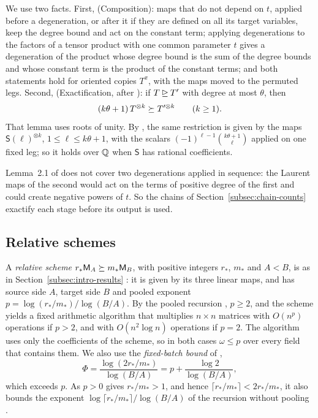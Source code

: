 We use two facts. First, \citep[Lemma~2.1]{FinCon26} (Composition): maps
that do not depend on \(t\), applied before a degeneration, or after it if
they are defined on all its target variables, keep the degree bound and
act on the constant term; applying degenerations to the factors of a
tensor product with one common parameter \(t\) gives a degeneration of
the product whose degree bound is the sum of the degree bounds and whose
constant term is the product of the constant terms; and both statements
hold for oriented copies \(T^\pi\), with the maps moved to the permuted
legs. Second, \citep[Lemma~2.2]{FinCon26} (Exactification, after
\citet{Bini80}): if \(T\unrhd T'\) with degree at most \(\theta\), then
\[
 (k\theta+1)\,T^{\otimes k}\succeq T'^{\otimes k}\qquad(k\ge1).
\]
That lemma uses roots of unity. By \citep[Lemma~9.1(c)]{FinCon26}, the same
restriction is given by the maps \(\mathsf S(\ell)^{\otimes k}\),
\(1\le\ell\le k\theta+1\), with the scalars \((-1)^{\ell-1}\binom{k\theta+1}\ell\)
applied on one fixed leg; so it holds over \(\mathbb Q\) when \(\mathsf S\) has
rational coefficients.

Lemma~2.1 of \citep{FinCon26} does not cover two degenerations applied
in sequence: the Laurent maps of the second would act on the terms of
positive degree of the first and could create negative powers of \(t\).
So the chains of Section~\ref{subsec:chain-counts} exactify each stage
before its output is used.

\subsection{Relative schemes}
\label{subsec:prelim-schemes}

A \emph{relative scheme} \(r_*\mathsf M_A\succeq m_*\mathsf M_B\), with positive
integers \(r_*\), \(m_*\) and \(A<B\), is as in
Section~\ref{subsec:intro-results} \citep[Definition~2.3]{FinCon26}: it
is given by its three linear maps, and has source side \(A\), target
side \(B\) and pooled exponent \(p=\log(r_*/m_*)/\log(B/A)\). By the
pooled recursion \citep[Lemma~2.4]{FinCon26}, \(p\ge2\), and the scheme
yields a fixed arithmetic algorithm that multiplies \(n\times n\)
matrices with \(O(n^p)\) operations if \(p>2\), and with
\(O(n^2\log n)\) operations if \(p=2\). The algorithm uses only the
coefficients of the scheme, so in both cases \(\omega\le p\) over every
field that contains them. We also use the \emph{fixed-batch bound}
of \citep[(10.1)]{FinCon26},
\begin{equation}\label{eq:prelim-phi}
 \Phi=\frac{\log(2r_*/m_*)}{\log(B/A)}=p+\frac{\log2}{\log(B/A)},
\end{equation}
which exceeds \(p\). As \(p>0\) gives \(r_*/m_*>1\), and hence
\(\lceil r_*/m_*\rceil<2r_*/m_*\), it also bounds the exponent
\(\log\lceil r_*/m_*\rceil/\log(B/A)\) of the recursion without pooling
\citep[Section~10.1]{FinCon26}.

